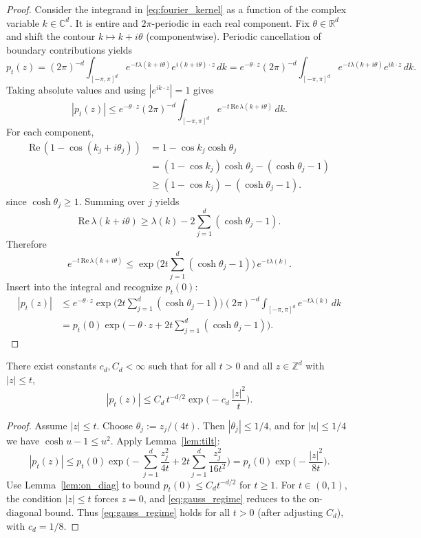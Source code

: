 \begin{proof}
Consider the integrand in \eqref{eq:fourier_kernel} as a function of the complex variable $k\in\mathbb C^d$.
It is entire and $2\pi$-periodic in each real component.
Fix $\theta\in\mathbb R^d$ and shift the contour $k\mapsto k+i\theta$ (componentwise).
Periodic cancellation of boundary contributions yields
\[
p_t(z)
=
(2\pi)^{-d}\int_{[-\pi,\pi]^d} e^{-t\lambda(k+i\theta)}e^{i(k+i\theta)\cdot z}\,dk
=
e^{-\theta\cdot z}(2\pi)^{-d}\int_{[-\pi,\pi]^d} e^{-t\lambda(k+i\theta)}e^{ik\cdot z}\,dk.
\]
Taking absolute values and using $|e^{ik\cdot z}|=1$ gives
\[
|p_t(z)|
\le
e^{-\theta\cdot z}(2\pi)^{-d}\int_{[-\pi,\pi]^d} e^{-t\,\mathrm{Re}\,\lambda(k+i\theta)}\,dk.
\]
For each component,
\[
\begin{aligned}
\mathrm{Re}\,(1-\cos(k_j+i\theta_j))
&=1-\cos k_j\cosh\theta_j\\
&=(1-\cos k_j)\cosh\theta_j-(\cosh\theta_j-1)\\
&\ge (1-\cos k_j)-(\cosh\theta_j-1).
\end{aligned}
\]
since $\cosh\theta_j\ge 1$.
Summing over $j$ yields
\[
\mathrm{Re}\,\lambda(k+i\theta)\ge \lambda(k)-2\sum_{j=1}^d(\cosh\theta_j-1).
\]
Therefore
\[
e^{-t\,\mathrm{Re}\,\lambda(k+i\theta)}
\le
\exp\!\Big(2t\sum_{j=1}^d(\cosh\theta_j-1)\Big)\,e^{-t\lambda(k)}.
\]
Insert into the integral and recognize $p_t(0)$:
\[
\begin{aligned}
|p_t(z)|
&\le e^{-\theta\cdot z}\exp\!\Big(2t\sum_{j=1}^d(\cosh\theta_j-1)\Big)
(2\pi)^{-d}\int_{[-\pi,\pi]^d}e^{-t\lambda(k)}\,dk\\
&=p_t(0)\exp\!\Big(-\theta\cdot z + 2t\sum_{j=1}^d(\cosh\theta_j-1)\Big).
\end{aligned}
\]
\end{proof}

\begin{proposition}\label{prop:gauss_regime}
There exist constants $c_d,C_d<\infty$ such that for all $t>0$ and all $z\in\mathbb Z^d$ with $|z|\le t$,
\begin{equation}\label{eq:gauss_regime}
|p_t(z)|\le C_d\,t^{-d/2}\exp\!\Big(-c_d\,\frac{|z|^2}{t}\Big).
\end{equation}
\end{proposition}

\begin{proof}
Assume $|z|\le t$.
Choose $\theta_j:=z_j/(4t)$.
Then $|\theta_j|\le 1/4$, and for $|u|\le 1/4$ we have $\cosh u-1\le u^2$.
Apply Lemma~\ref{lem:tilt}:
\[
|p_t(z)|\le p_t(0)\exp\!\Big(-\sum_{j=1}^d\frac{z_j^2}{4t}+2t\sum_{j=1}^d\frac{z_j^2}{16t^2}\Big)
=
p_t(0)\exp\!\Big(-\frac{|z|^2}{8t}\Big).
\]
Use Lemma~\ref{lem:on_diag} to bound $p_t(0)\le C_d t^{-d/2}$ for $t\ge 1$.
For $t\in(0,1)$, the condition $|z|\le t$ forces $z=0$, and \eqref{eq:gauss_regime} reduces to the on-diagonal bound.
Thus \eqref{eq:gauss_regime} holds for all $t>0$ (after adjusting $C_d$), with $c_d=1/8$.
\end{proof}


